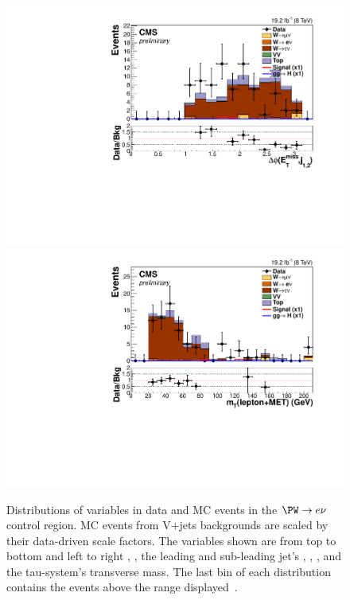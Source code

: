 \begin{figure}
  \includegraphics[width=.65\largefigwidth]{plots/parked/HIG-14-038-figs/output_sigreg/taunu_jetmetnomu_mindphi.pdf}
  \includegraphics[width=.65\largefigwidth]{plots/parked/HIG-14-038-figs/output_sigreg/taunu_lep_mt.pdf}
  \caption{Distributions of variables in data and \ac{MC} events in the $\PW\rightarrow e\nu$ control region. \ac{MC} events from V+jets backgrounds are scaled by their data-driven scale factors. The variables shown are from top to bottom and left to right \detajj, \Mjj, the leading and sub-leading jet's \pt, \METnoMU, \METsig, \jetmetdphileading and the tau-\MET system's transverse mass. The last bin of each distribution contains the events above the range displayed~\cite{CMS-PAS-HIG-14-038}.}
  \label{fig:parkedwtaunu}
\end{figure}

